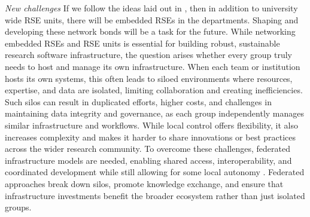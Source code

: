 \documentclass{eceasst}
\begin{document}
\emph{New challenges}
If we follow the ideas laid out in \cite{Kempf2025-draft}, then in addition to university wide RSE units,
there will be embedded RSEs in the departments. Shaping and developing these network bonds will be a task for the future.
While networking embedded RSEs and RSE units is essential for building robust, sustainable research software infrastructure, the question arises whether every group truly needs to host and manage its own infrastructure.
When each team or institution hosts its own systems, this often leads to siloed environments where resources, expertise, and data are isolated, limiting collaboration and creating inefficiencies. Such silos can result in duplicated efforts, higher costs, and challenges in maintaining data integrity and governance, as each group independently manages similar infrastructure and workflows. While local control offers flexibility, it also increases complexity and makes it harder to share innovations or best practices across the wider research community. To overcome these challenges, federated infrastructure models are needed, enabling shared access, interoperability, and coordinated development while still allowing for some local autonomy \cite{Jelinek2021}.
Federated approaches break down silos, promote knowledge exchange, and ensure that infrastructure investments benefit the broader ecosystem rather than just isolated groups.
\end{document}
